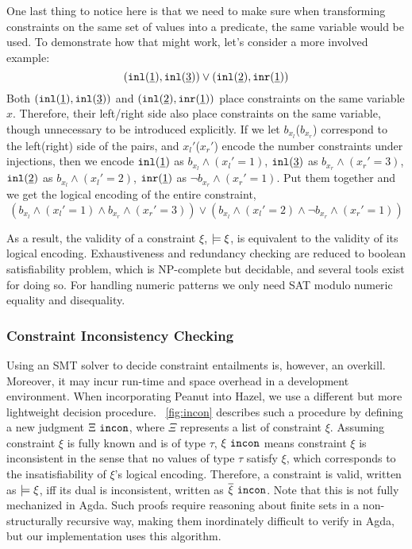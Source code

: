 One last thing to notice here is that we need to make sure when transforming constraints on the same set of values into a predicate, the same variable would be used. To demonstrate how that might work, let's consider a more involved example:
\[ (\mathtt{inl}(\underline{1}) , \mathtt{inl}(\underline{3})) \vee (\mathtt{inl}(\underline{2}) , \mathtt{inr}(\underline{1})) \]
Both $(\mathtt{inl}(\underline{1}) , \mathtt{inl}(\underline{3}))$ and $(\mathtt{inl}(\underline{2}) , \mathtt{inr}(\underline{1}))$ place constraints on the same variable $x$.
Therefore, their left/right side also place constraints on the same variable, though unnecessary to be introduced explicitly.
If we let $b_{x_l}$($b_{x_r}$) correspond to the left(right) side of the pairs, and $x_l'$($x_r'$) encode the number constraints under injections, 
then 
we encode $\mathtt{inl}(\underline{1})$ as $b_{x_l} \wedge (x_l'=1)$, 
$\mathtt{inl}(\underline{3})$ as $b_{x_r} \wedge (x_r'=3)$,
$\mathtt{inl}(\underline{2})$ as $b_{x_l} \wedge (x_l'=2)$,
$\mathtt{inr}(\underline{1})$ as $\neg b_{x_r} \wedge (x_r'=1)$. 
Put them together and we get the logical encoding of the entire constraint, 
\[
(b_{x_l} \wedge (x_l'=1) \wedge
b_{x_r} \wedge (x_r'=3))
\vee
(b_{x_l} \wedge (x_l'=2) \wedge
\neg b_{x_r} \wedge (x_r'=1))
\]

As a result, the validity of a constraint $\xi$, $\models \xi$, is equivalent to the validity of its logical encoding. Exhaustiveness and redundancy checking are reduced to boolean satisfiability problem, which is NP-complete but decidable, and several tools exist for doing so. For handling numeric patterns we only need SAT modulo numeric equality and disequality.

\subsubsection{Constraint Inconsistency Checking}\label{sec:incon}

Using an SMT solver to decide constraint entailments is, however, an overkill. Moreover, it may incur run-time and space overhead in a  development environment. When incorporating Peanut into Hazel, we use a different but more lightweight decision procedure. \figurename~\ref{fig:incon} describes such a procedure by defining a new judgment $\Xi ~\mathtt{incon}$, where $\Xi$ represents a list of constraint $\xi$. Assuming constraint $\xi$ is fully known and is of type $\tau$, $\xi ~\mathtt{incon}$ means constraint $\xi$ is inconsistent in the sense that no values of type $\tau$ satisfy $\xi$, which corresponds to the insatisfiability of $\xi$'s logical encoding. Therefore, a constraint is valid, written as $\models \xi$, iff its dual is inconsistent, written as $\overline{\xi} ~\mathtt{incon}$. Note that this is not fully mechanized in Agda. Such proofs require reasoning about finite sets in a non-structurally recursive way, making them inordinately difficult to verify in Agda, but our implementation uses this algorithm.


